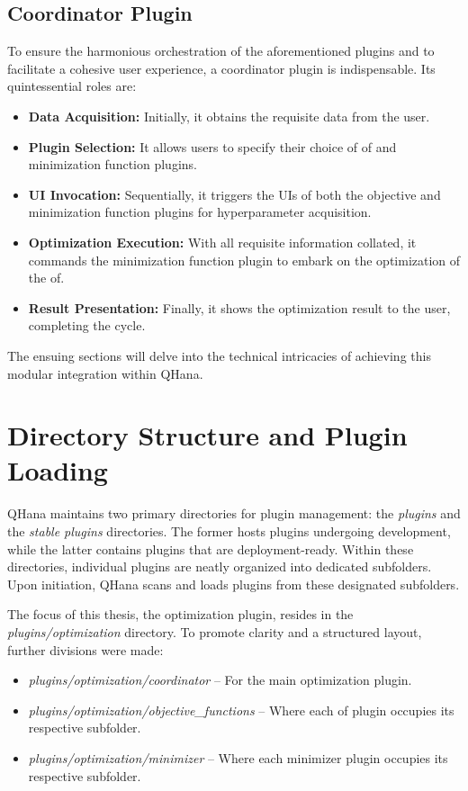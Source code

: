 \documentclass[
  a4paper,  %
  twoside,  %
  bibliography=totoc,
  headsepline,
  cleardoublepage=empty,
  parskip=half,
  draft=false
]{scrbook}
\begin{document}
\subsection{Coordinator Plugin}
To ensure the harmonious orchestration of the aforementioned plugins and to facilitate a cohesive user experience, a coordinator plugin is indispensable. Its quintessential roles are:

\begin{itemize}
\item \textbf{Data Acquisition:} Initially, it obtains the requisite data from the user.
\item \textbf{Plugin Selection:} It allows users to specify their choice of \gls{of} and minimization function plugins.
\item \textbf{UI Invocation:} Sequentially, it triggers the UIs of both the objective and minimization function plugins for hyperparameter acquisition.
\item \textbf{Optimization Execution:} With all requisite information collated, it commands the minimization function plugin to embark on the optimization of the \gls{of}.
\item \textbf{Result Presentation:} Finally, it shows the optimization result to the user, completing the cycle.
\end{itemize}

The ensuing sections will delve into the technical intricacies of achieving this modular integration within QHana.

\section{Directory Structure and Plugin Loading}
\label{sec:directoryStructure}

QHana maintains two primary directories for plugin management: the \textit{plugins} and the \textit{stable plugins} directories.
The former hosts plugins undergoing development, while the latter contains plugins that are deployment-ready.
Within these directories, individual plugins are neatly organized into dedicated subfolders.
Upon initiation, QHana scans and loads plugins from these designated subfolders.

The focus of this thesis, the optimization plugin, resides in the \textit{plugins/optimization} directory.
To promote clarity and a structured layout, further divisions were made:

\begin{itemize}
  \item \textit{plugins/optimization/coordinator} – For the main optimization plugin.
  \item \textit{plugins/optimization/objective\_functions} – Where each \gls{of} plugin occupies its respective subfolder.
  \item \textit{plugins/optimization/minimizer} – Where each minimizer plugin occupies its respective subfolder.
\end{itemize}
\end{document}
